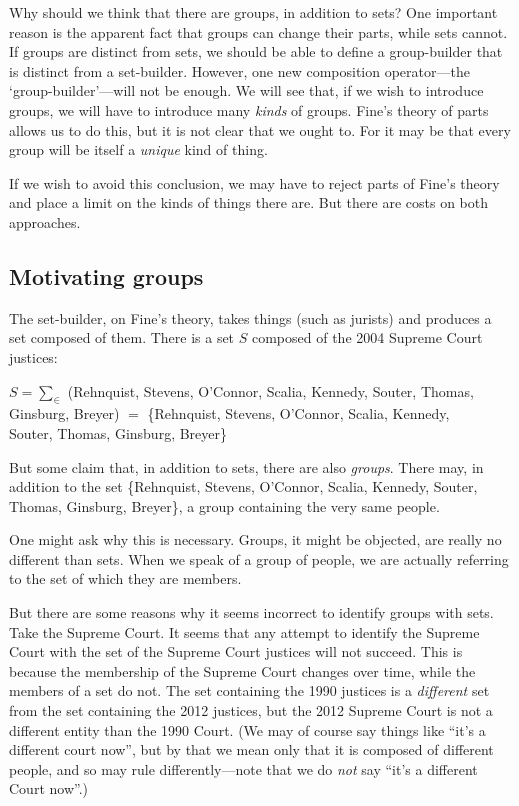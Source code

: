 \documentclass[11pt]{article}
\newenvironment{squote}{%
\begin{spacing}{1}
\begin{list}{}{%
\setlength{\labelwidth}{0pt}%
\rightmargin\leftmargin%
}
\item\relax
}{%
\end{list}%
\end{spacing}
}
\begin{document}
\begin{spacing}{1.5}
Why should we think that there are groups, in addition to sets?  One
important reason is the apparent fact that groups can change their
parts, while sets cannot.  If groups are distinct from sets, we should
be able to define a group-builder that is distinct from a set-builder.
However, one new composition operator---the `group-builder'---will not
be enough.  We will see that, if we wish to introduce groups, we will
have to introduce many {\em kinds} of groups.  Fine's theory of parts
allows us to do this, but it is not clear that we ought to.  For it
may be that every group will be itself a {\em unique} kind of thing.

If we wish to avoid this conclusion, we may have to reject parts of
Fine's theory and place a limit on the kinds of things there are.  But
there are costs on both approaches.

\subsection{Motivating groups}
\label{why-group}
The set-builder, on Fine's theory, takes things (such as jurists) and
produces a set composed of them.  There is a set $S$ composed of the
2004 Supreme Court justices:

\begin{squote}
$S = \sum _{\in}$ (Rehnquist, Stevens, O'Connor, Scalia, Kennedy,
  Souter, Thomas, \\ Ginsburg, Breyer) $ = $ \{Rehnquist, Stevens,
  O'Connor, Scalia, Kennedy, \\ Souter, Thomas, Ginsburg, Breyer\}
\end{squote}

But some claim that, in addition to sets, there are also {\em groups}.
There may, in addition to the set \{Rehnquist, Stevens, O'Connor,
Scalia, Kennedy, Souter, Thomas, Ginsburg, Breyer\}, a group
containing the very same people.

One might ask why this is necessary.  Groups, it might be objected,
are really no different than sets.  When we speak of a group of
people, we are actually referring to the set of which they are
members.

But there are some reasons why it seems incorrect to identify groups
with sets.  Take the Supreme Court.  It seems that any attempt to
identify the Supreme Court with the set of the Supreme Court justices
will not succeed.  This is because the membership of the Supreme Court
changes over time, while the members of a set do not.  The set
containing the 1990 justices is a {\em different} set from the set
containing the 2012 justices, but the 2012 Supreme Court is not a
different entity than the 1990 Court.  (We may of course say things
like ``it's a different court now'', but by that we mean only that it
is composed of different people, and so may rule differently---note
that we do {\em not} say ``it's a different Court now''.)


\end{spacing}
\end{document}
